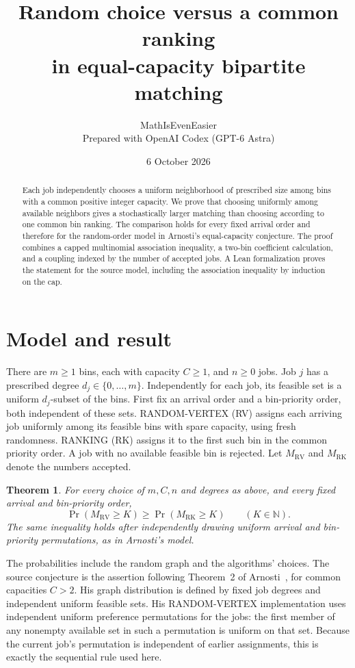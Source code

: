 \documentclass[11pt]{article}
\title{Random choice versus a common ranking\\in equal-capacity bipartite matching}
\author{MathIsEvenEasier\\\small Prepared with OpenAI Codex (GPT-6 Astra)}
\date{6 October 2026}
\newtheorem{theorem}{Theorem}
\newcommand{\RV}{\mathrm{RV}}
\newcommand{\RK}{\mathrm{RK}}
\begin{document}
\maketitle

\begin{abstract}
Each job independently chooses a uniform neighborhood of prescribed size
among bins with a common positive integer capacity. We prove that choosing
uniformly among available neighbors gives a stochastically larger matching
than choosing according to one common bin ranking. The comparison holds
for every fixed arrival order and therefore for the random-order model
in Arnosti's equal-capacity conjecture. The proof combines a capped
multinomial association inequality, a two-bin coefficient calculation,
and a coupling indexed by the number of accepted jobs. A Lean formalization
proves the statement for the source model, including the association
inequality by induction on the cap.
\end{abstract}

\section{Model and result}\label{sec:model}
There are $m\geq1$ bins, each with capacity $C\geq1$, and $n\geq0$
jobs. Job $j$ has a prescribed degree $d_j\in\{0,\ldots,m\}$.
Independently for each job, its feasible set is a uniform $d_j$-subset of
the bins. First fix an arrival order and a bin-priority order, both
independent of these sets. RANDOM-VERTEX (RV) assigns each arriving job
uniformly among its feasible bins with spare capacity, using fresh
randomness. RANKING (RK) assigns it to the first such bin in the common
priority order. A job with no available feasible bin is rejected.
Let $M_{\RV}$ and $M_{\RK}$ denote the numbers accepted.

\begin{theorem}\label{thm:fullconjecture}
For every choice of $m,C,n$ and degrees as above, and every fixed arrival
and bin-priority order,
\begin{equation}\label{eq:main}
 \Pr(M_{\RV}\geq K)\geq\Pr(M_{\RK}\geq K)
 \qquad(K\in\mathbb N).
\end{equation}
The same inequality holds after independently drawing uniform arrival
and bin-priority permutations, as in Arnosti's model.
\end{theorem}

The probabilities include the random graph and the algorithms' choices.
The source conjecture is the assertion following Theorem~2 of
Arnosti~\cite{arnosti}, for common capacities $C>2$. His graph distribution
is defined by fixed job degrees and independent uniform feasible sets.
His RANDOM-VERTEX implementation uses independent uniform preference
permutations for the jobs: the first member of any nonempty available
set in such a permutation is uniform on that set. Because the current
job's permutation is independent of earlier assignments, this is exactly
the sequential rule used here.
\end{document}
